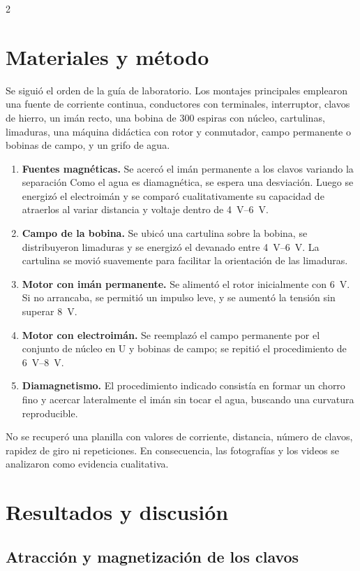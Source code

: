 \documentclass[10pt,letterpaper]{article}
\begin{document}
\begin{multicols}{2}
\section{Materiales y método}

Se siguió el orden de la guía de laboratorio. Los montajes principales emplearon una fuente de corriente continua, conductores con terminales, interruptor, clavos de hierro, un imán recto, una bobina de 300 espiras con núcleo, cartulinas, limaduras, una máquina didáctica con rotor y conmutador, campo permanente o bobinas de campo, y un grifo de agua.

\begin{enumerate}
  \item \textbf{Fuentes magnéticas.} Se acercó el imán permanente a los clavos variando la separación Como el agua es diamagnética, se espera una desviación. Luego se energizó el electroimán y se comparó cualitativamente su capacidad de atraerlos al variar distancia y voltaje dentro de \SIrange{4}{6}{\volt}.
  \item \textbf{Campo de la bobina.} Se ubicó una cartulina sobre la bobina, se distribuyeron limaduras y se energizó el devanado entre \SIrange{4}{6}{\volt}. La cartulina se movió suavemente para facilitar la orientación de las limaduras.
  \item \textbf{Motor con imán permanente.} Se alimentó el rotor inicialmente con \SI{6}{\volt}. Si no arrancaba, se permitió un impulso leve, y se aumentó la tensión sin superar \SI{8}{\volt}.
  \item \textbf{Motor con electroimán.} Se reemplazó el campo permanente por el conjunto de núcleo en U y bobinas de campo; se repitió el procedimiento de \SIrange{6}{8}{\volt}.
  \item \textbf{Diamagnetismo.} El procedimiento indicado consistía en formar un chorro fino y acercar lateralmente el imán sin tocar el agua, buscando una curvatura reproducible.
\end{enumerate}

No se recuperó una planilla con valores de corriente, distancia, número de clavos, rapidez de giro ni repeticiones. En consecuencia, las fotografías y los videos se analizaron como evidencia cualitativa.

\section{Resultados y discusión}

\subsection{Atracción y magnetización de los clavos}


\end{multicols}
\end{document}
